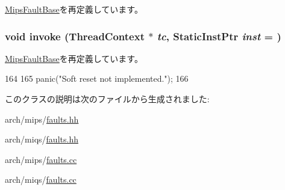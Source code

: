 \hyperlink{classMipsISA_1_1MipsFaultBase_a2bd783b42262278d41157d428e1f8d6f}{MipsFaultBase}を再定義しています。\hypertarget{classMipsISA_1_1SoftResetFault_a2bd783b42262278d41157d428e1f8d6f}{
\subsubsection[{invoke}]{\setlength{\rightskip}{0pt plus 5cm}void invoke ({\bf ThreadContext} $\ast$ {\em tc}, \/  {\bf StaticInstPtr} {\em inst} = {})}}
\label{classMipsISA_1_1SoftResetFault_a2bd783b42262278d41157d428e1f8d6f}


\hyperlink{classMipsISA_1_1MipsFaultBase_a2bd783b42262278d41157d428e1f8d6f}{MipsFaultBase}を再定義しています。


\begin{DoxyCode}
164 {
165     panic("Soft reset not implemented.\n");
166 }
\end{DoxyCode}


このクラスの説明は次のファイルから生成されました:\begin{DoxyCompactItemize}
\item 
arch/mips/\hyperlink{arch_2mips_2faults_8hh}{faults.hh}\item 
arch/miqs/\hyperlink{arch_2miqs_2faults_8hh}{faults.hh}\item 
arch/mips/\hyperlink{arch_2mips_2faults_8cc}{faults.cc}\item 
arch/miqs/\hyperlink{arch_2miqs_2faults_8cc}{faults.cc}\end{DoxyCompactItemize}
